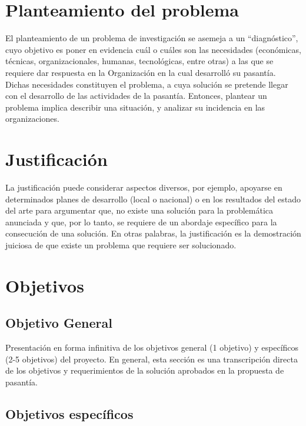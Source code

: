 \documentclass[12pt,letterpaper]{report}
\begin{document}
\chapter{Planteamiento del problema}

El planteamiento de un problema de investigación se asemeja a un ``diagnóstico'', cuyo objetivo es poner en evidencia cuál o cuáles son las necesidades (económicas, técnicas, organizacionales, humanas, tecnológicas, entre otras) a las que se requiere dar respuesta en la Organización en la cual desarrolló su pasantía. Dichas necesidades constituyen el problema, a cuya solución se pretende llegar con el desarrollo de las actividades de la pasantía. Entonces, plantear un problema implica describir una situación, y analizar su incidencia en las organizaciones.

\chapter{Justificación}

La justificación puede considerar aspectos diversos, por ejemplo, apoyarse en determinados planes de desarrollo (local o nacional) o en los resultados del estado del arte para argumentar que, no existe una solución para la problemática anunciada y que, por lo tanto, se requiere de un abordaje específico para la consecución de una solución. En otras palabras, la justificación es la demostración juiciosa de que existe un problema que requiere ser solucionado.

\chapter{Objetivos}

\section{Objetivo General}

Presentación en forma infinitiva de los objetivos general (1 objetivo) y específicos (2-5 objetivos) del proyecto. En general, esta sección es una transcripción directa de los objetivos y requerimientos de la solución aprobados en la propuesta de pasantía.

\section{Objetivos específicos}
\end{document}
